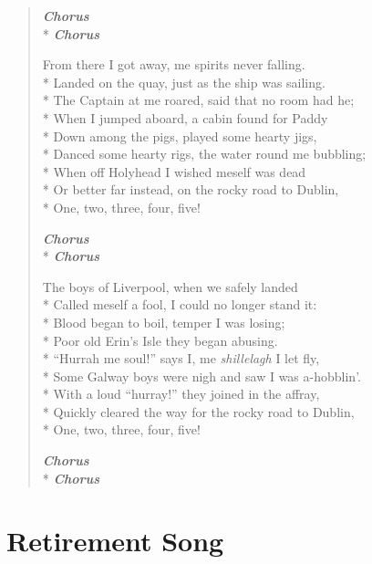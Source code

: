 \documentclass[9pt,twoside]{extarticle}
\makeatletter
\newenvironment{xverse}{
	\begin{verse}
	\fontsize{8.5}{10.5}\selectfont
}{
	\end{verse}
}
\newcommand{\chorus@mark}[1][1]{%
\textbf{\emph{Chorus \ifthenelse{\equal{#1}{1}}{}{$\times$ #1}}}%
}
\newcommand{\chorusmark}[1][1]{%
\ifvmode%
\vspace{-0.5\stanzaskip}%
\chorus@mark[#1]%
\vspace{-0.5\stanzaskip}%
\else \\*%
\chorus@mark[#1]%
\fi%
}
\makeatother
\begin{document}
\begin{xverse}
\chorusmark

From there I got away, me spirits never falling. \\*
Landed on the quay, just as the ship was sailing. \\*
The Captain at me roared, said that no room had he; \\*
When I jumped aboard, a cabin found for Paddy \\*
Down among the pigs, played some hearty jigs, \\*
Danced some hearty rigs, the water round me bubbling; \\*
When off Holyhead I wished meself was dead \\*
Or better far instead, on the rocky road to Dublin, \\*
One, two, three, four, five!

\chorusmark

The boys of Liverpool, when we safely landed \\*
Called meself a fool, I could no longer stand it: \\*
Blood began to boil, temper I was losing; \\*
Poor old Erin’s Isle they began abusing. \\*
“Hurrah me soul!” says I, me \emph{shillelagh} I let fly, \\*
Some Galway boys were nigh and saw I was a-hobblin’. \\*
With a loud “hurray!” they joined in the affray, \\*
Quickly cleared the way for the rocky road to Dublin, \\*
One, two, three, four, five!

\chorusmark[2]
\end{xverse}

\section{Retirement Song}
\end{document}
